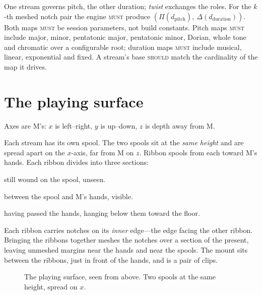\documentclass[11pt,a4paper]{article}
\newcommand{\MUST}{\textsc{must}}
\newcommand{\SHOULD}{\textsc{should}}
\theoremstyle{definition}
\theoremstyle{plain}
\theoremstyle{remark}
\newcommand{\spools}{%
  \fill[ribL,opacity=.45,rounded corners=2pt] (1.55,5.40) rectangle (2.45,5.95);
  \fill[ribR,opacity=.45,rounded corners=2pt] (5.55,5.40) rectangle (6.45,5.95);
  \node[font=\scriptsize] at (2,6.22) {left spool};
  \node[font=\scriptsize] at (6,6.22) {right spool};
}
\newcommand{\musician}{%
  \draw[gray] (4,-0.10) circle (0.23);
  \node[font=\scriptsize] at (4,-0.10) {M};
}
\newcommand{\axes}{%
  \draw[->,gray,thin] (0.85,4.30) -- (1.45,4.30) node[right,font=\scriptsize]{$x$};
  \draw[->,gray,thin] (0.85,4.30) -- (0.85,4.90) node[above,font=\scriptsize]{$z$};
}
\newcommand{\ribbonszipped}{%
  \draw[ribL,opacity=.45,line width=16pt,line join=round]
    (2,5.40) -- (2,4.60) -- (3.72,4.20) -- (3.72,2.20) -- (3.10,1.70) -- (3.10,0.70);
  \draw[ribR,opacity=.45,line width=16pt,line join=round]
    (6,5.40) -- (6,4.60) -- (4.28,4.20) -- (4.28,2.20) -- (4.90,1.70) -- (4.90,0.70);
}
\newcommand{\mesh}[2]{%
  \draw[gray!75,decorate,decoration={zigzag,segment length=5pt,amplitude=3pt}]
    (4,#1) -- (4,#2);
}
\newcommand{\mountclips}{%
  \fill[amb,opacity=.75,rounded corners=1pt] (3.76,1.05) rectangle (3.92,1.45);
  \fill[amb,opacity=.75,rounded corners=1pt] (4.08,1.05) rectangle (4.24,1.45);
}
\newcommand{\handat}[2]{\filldraw[fill=white,draw=gray!80,thin] (#1,#2) circle (0.17);}
\newcommand{\handsdefault}{\handat{3.10}{0.55}\handat{4.90}{0.55}}
\begin{document}
One stream governs pitch, the other duration; \emph{twist} exchanges the roles. For the $k$-th
meshed notch pair the engine \MUST{} produce
$(\Pi(d_{\text{pitch}}),\ \Delta(d_{\text{duration}}))$. Both maps \MUST{} be session parameters,
not build constants. Pitch maps \MUST{} include major, minor, pentatonic major, pentatonic minor,
Dorian, whole tone and chromatic over a configurable root; duration maps \MUST{} include musical,
linear, exponential and fixed. A stream's base \SHOULD{} match the cardinality of the map it drives.

\section{The playing surface}
\label{sec:surface}

Axes are M's: $x$ is left--right, $y$ is up--down, $z$ is depth away from M.

Each stream has its own spool. The two spools sit at the \emph{same height} and are spread apart on
the $x$-axis, far from M on $z$. Ribbon spools from each toward M's hands. Each ribbon divides into
three sections:

\begin{description}[leftmargin=1.6cm,style=nextline]
\item[\textbf{Future}] still wound on the spool, unseen.
\item[\textbf{Present}] between the spool and M's hands, visible.
\item[\textbf{Past}] having passed the hands, hanging below them toward the floor.
\end{description}

Each ribbon carries notches on its \emph{inner} edge---the edge facing the other ribbon. Bringing
the ribbons together meshes the notches over a section of the present, leaving unmeshed margins
near the hands and near the spools. The mount sits between the ribbons, just in front of the hands,
and is a pair of clips.

\begin{figure}[H]\centering
{}
\caption{The playing surface, seen from above. Two spools at the same height, spread on $x$.}
\end{figure}
\end{document}
